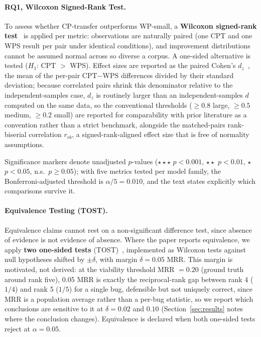 \documentclass[a4paper,fleqn]{cas-dc}
\begin{document}
\paragraph{RQ1, Wilcoxon Signed-Rank Test.}
 To assess whether CP-transfer outperforms WP-small, a
\textbf{Wilcoxon signed-rank test}~\citep{wilcoxon1945,arcuri2011practical}
is applied per metric: observations are naturally paired (one CPT and one
WPS result per pair under identical conditions), and improvement
distributions cannot be assumed normal across so diverse a corpus. A
one-sided alternative is tested ($H_1$: CPT $>$ WPS). Effect sizes are
reported as the paired Cohen's $d_z$~\citep{cohen1988statistical,kampenes2007systematic,arcuri2014hitchhiker},
the mean of the per-pair CPT$-$WPS differences divided by their standard
deviation; because correlated pairs shrink this denominator relative to
the independent-samples case, $d_z$ is routinely larger than an
independent-samples $d$ computed on the same data, so the conventional
thresholds ($\geq 0.8$ large, $\geq 0.5$ medium, $\geq 0.2$ small) are
reported for comparability with prior literature as a convention rather
than a strict benchmark, alongside the matched-pairs
rank-biserial correlation $r_{rb}$, a signed-rank-aligned effect size that
is free of normality assumptions.

Significance markers denote unadjusted $p$-values ($\star\star\star$
$p<0.001$, $\star\star$ $p<0.01$, $\star$ $p<0.05$, n.s.\ $p\geq0.05$); with
five metrics tested per model family, the Bonferroni-adjusted threshold is
$\alpha/5 = 0.010$, and the text states explicitly which comparisons
survive it.

\paragraph{Equivalence Testing (TOST).}
Equivalence claims cannot rest on a non-significant difference test, since
absence of evidence is not evidence of absence. Where the paper reports
equivalence, we apply \textbf{two one-sided tests} (TOST)~\citep{schuirmann1987,lakens2017equivalence},
implemented as Wilcoxon tests against null hypotheses shifted by
$\pm\delta$, with margin $\delta = 0.05$ MRR. This margin is motivated, not
derived: at the viability threshold MRR $=0.20$ (ground truth around rank
five), 0.05 MRR is exactly the reciprocal-rank gap between rank 4 ($1/4$)
and rank 5 ($1/5$) for a single bug, defensible but not uniquely
correct, since MRR is a population average rather than a per-bug
statistic, so we report which conclusions are sensitive to it at
$\delta = 0.02$ and $0.10$ (Section~\ref{sec:results} notes where the
conclusion changes). Equivalence is declared when both one-sided tests
reject at $\alpha = 0.05$.
\end{document}
